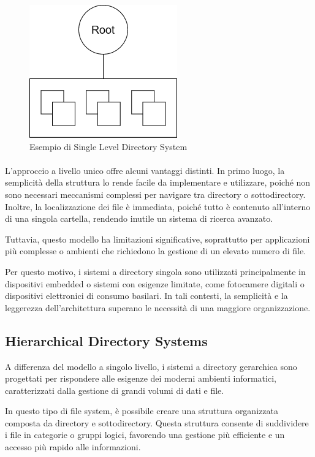 \documentclass[12pt,a4paper,openright,twoside]{book}
\begin{document}
            \begin{figure}
                \centering
                \includegraphics[width=.3\linewidth]{figures/SingleDirSystem.png}
                \caption{Esempio di Single Level Directory System}
                \label{fig:single-level-directory}
            \end{figure}

            \paragraph*{}

            L'approccio a livello unico offre alcuni vantaggi distinti. In primo luogo, la semplicità della struttura lo rende facile da implementare e utilizzare, poiché non sono necessari meccanismi complessi per navigare tra directory o sottodirectory. Inoltre, la localizzazione dei file è immediata, poiché tutto è contenuto all'interno di una singola cartella, rendendo inutile un sistema di ricerca avanzato.

            Tuttavia, questo modello ha limitazioni significative, soprattutto per applicazioni più complesse o ambienti che richiedono la gestione di un elevato numero di file.

            Per questo motivo, i sistemi a directory singola sono utilizzati principalmente in dispositivi embedded o sistemi con esigenze limitate, come fotocamere digitali o dispositivi elettronici di consumo basilari. In tali contesti, la semplicità e la leggerezza dell'architettura superano le necessità di una maggiore organizzazione.

        \subsection{Hierarchical Directory Systems}

            A differenza del modello a singolo livello, i sistemi a directory gerarchica sono progettati per rispondere alle esigenze dei moderni ambienti informatici, caratterizzati dalla gestione di grandi volumi di dati e file.

            
            In questo tipo di file system, è possibile creare una struttura organizzata composta da directory e sottodirectory. Questa struttura consente di suddividere i file in categorie o gruppi logici, favorendo una gestione più efficiente e un accesso più rapido alle informazioni.
            
\end{document}

